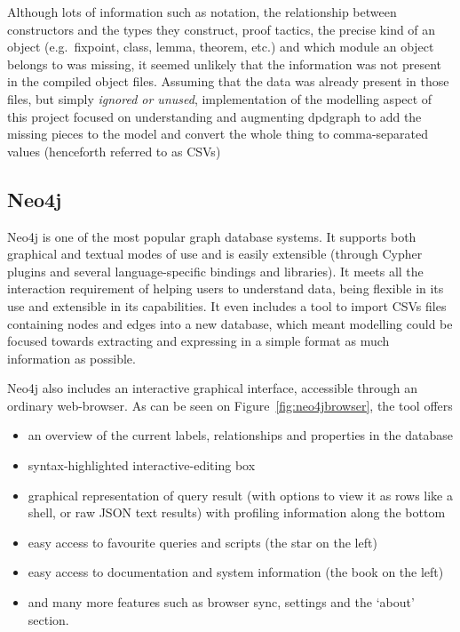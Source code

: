 Although lots of information such as notation, the relationship between
constructors and the types they construct, proof tactics, the precise kind of an
object (e.g.\  fixpoint, class, lemma, theorem, etc.) and which module an object
belongs to was missing, it seemed unlikely that the information was not present
in the compiled object files. Assuming that the data was already present in
those files, but simply \emph{ignored or unused}, implementation of the
modelling aspect of this project focused on understanding and augmenting
dpdgraph to add the missing pieces to the model and convert the whole thing to
comma-separated values (henceforth referred to as CSVs)

\subsection{Neo4j}
\label{subsec:neo4jandtools}

Neo4j is one of the most popular graph database systems. It supports both
graphical and textual modes of use and is easily extensible (through Cypher
plugins and several language-specific bindings and libraries). It meets all the
interaction requirement of helping users to understand data, being flexible in
its use and extensible in its capabilities. It even includes a tool to import
CSVs files containing nodes and edges into a new database, which meant modelling
could be focused towards extracting and expressing in a simple format as much
information as possible.

Neo4j also includes an interactive graphical interface, accessible through an
ordinary web-browser. As can be seen on Figure~\ref{fig:neo4jbrowser}, the tool
offers 
\begin{itemize}
  \item an overview of the current labels, relationships and properties in the
        database
  \item syntax-highlighted interactive-editing box
  \item graphical representation of query result (with options to view it as
        rows like a shell, or raw JSON text results) with profiling information
        along the bottom
  \item easy access to favourite queries and scripts (the star on the left)
  \item easy access to documentation and system information (the book on the
        left)
  \item and many more features such as browser sync, settings and the `about'
        section.
\end{itemize}

